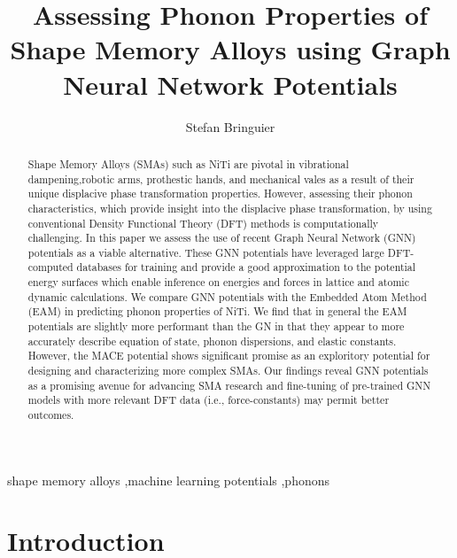 \documentclass[preprint]{elsarticle}
\begin{document}
\title{Assessing Phonon Properties of Shape Memory Alloys using Graph Neural Network Potentials}

\author[1]{Stefan Bringuier}

\begin{abstract}
Shape Memory Alloys (SMAs) such as NiTi are pivotal in vibrational dampening,robotic arms, prothestic hands, and mechanical vales as a result of their unique displacive phase transformation properties. However, assessing their phonon characteristics, which provide insight into the displacive phase transformation, by using conventional Density Functional Theory (DFT) methods is computationally challenging. In this paper we assess the use of recent Graph Neural Network (GNN) potentials as a viable alternative. These GNN potentials have leveraged large DFT-computed databases for training and provide a good approximation to the potential energy surfaces which enable inference on energies and forces in lattice and atomic dynamic calculations. We compare GNN potentials with the Embedded Atom Method (EAM) in predicting phonon properties of NiTi. We find that in general the EAM potentials are slightly more performant than the GN in that they appear to more accurately describe equation of state, phonon dispersions, and elastic constants. However, the MACE potential shows significant promise as an exploritory potential for designing and characterizing more complex SMAs. Our findings reveal GNN potentials as a promising avenue for advancing SMA research and fine-tuning of pre-trained GNN models with more relevant DFT data (i.e., force-constants) may permit better outcomes.  
\end{abstract}

\begin{keyword}
  shape memory alloys \sep machine learning potentials \sep phonons
\end{keyword}


\maketitle

\section{Introduction}
\label{sec:intro}
\end{document}
